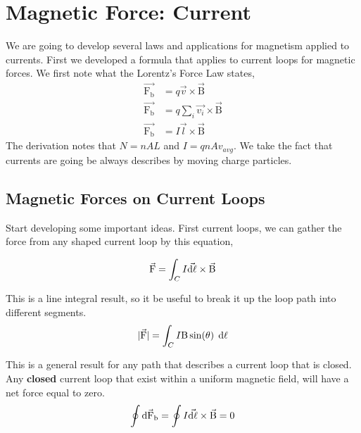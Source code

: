 \chapter{Magnetic Force: Current}
We are going to develop several laws and applications for magnetism applied to currents. First we developed a formula that applies to current loops for magnetic forces. We first note what the Lorentz's Force Law states, 
\begin{align*}
	\vec{\mathrm{F_b}} &= q\vec{v} \times \vec{\mathrm{B}} \\ 
	\vec{\mathrm{F_b}} &= q\sum_i\vec{v_i} \times \vec{\mathrm{B}} \\ 
	\vec{\mathrm{F_b}} &= I\vec{l} \times \vec{\mathrm{B}}
\end{align*}
The derivation notes that $N=nAL$ and $I=qnAv_{avg}$. We take the fact that currents are going be always describes by moving charge particles. 

\section{Magnetic Forces on Current Loops}
Start developing some important ideas. First current loops, we can gather the force from any shaped current loop by this equation, 

\begin{equation*}
	\vec{\mathrm{F}} = \int_C I\vec{\mathrm{d\ell}} \times \vec{\mathrm{B}}
\end{equation*}

This is a line integral result, so it be useful to break it up the loop path into different segments.
\begin{equation*}
	|\vec{\mathrm{F}}| = \int_C I\mathrm{B}\sin(\theta) \:\: \mathrm{d\ell}
\end{equation*}

This is a general result for any path that describes a current loop that is closed. Any \textbf{closed} current loop that exist within a uniform magnetic field, will have a net force equal to zero.
\begin{equation*}
\oint \vec{\mathrm{dF_b}} = \oint I\vec{\mathrm{d\ell}} \times \vec{\mathrm{B}} = 0
\end{equation*}
\pagebreak
